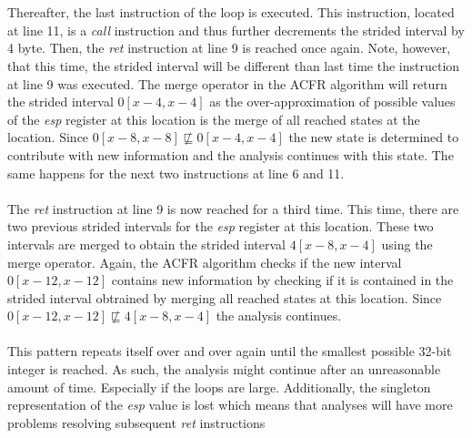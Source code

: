 \documentclass{kththesis}
\renewcommand{\it}[1]{\textit{#1}}
\begin{document}
\\ \\
Thereafter, the last instruction of the loop is executed. This instruction, located at line 11, is a \it{call} instruction and thus further decrements the strided interval by 4 byte. Then, the \it{ret} instruction at line 9 is reached once again. Note, however, that this time, the strided interval will be different than last time the instruction at line 9 was executed. The merge operator in the ACFR algorithm will return the strided interval $0[x-4,x-4]$ as the over-approximation of possible values of the \it{esp} register at this location is the merge of all reached states at the location. Since $0[x-8,x-8] \nsqsubseteq 0[x-4,x-4]$ the new state is determined to contribute with new information and the analysis continues with this state. The same happens for the next two instructions at line 6 and 11.
\\ \\
The \it{ret} instruction at line 9 is now reached for a third time. This time, there are two previous strided intervals for the \it{esp} register at this location. These two intervals are merged to obtain the strided interval $4[x-8,x-4]$ using the merge operator. Again, the ACFR algorithm checks if the new interval $0[x-12,x-12]$ contains new information by checking if it is contained in the strided interval obtrained by merging all reached states at this location. Since $0[x-12,x-12] \nsqsubseteq 4[x-8,x-4]$ the analysis continues.
\\ \\ 
This pattern repeats itself over and over again until the smallest possible 32-bit integer is reached. As such, the analysis might continue after an unreasonable amount of time. Especially if the loops are large. Additionally, the singleton representation of the \it{esp} value is lost which means that analyses will have more problems resolving subsequent \it{ret} instructions
\end{document}
